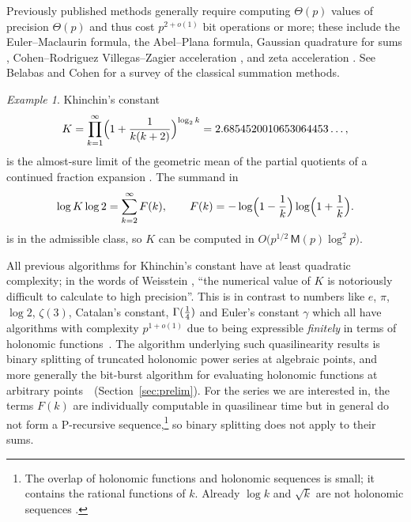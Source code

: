 \documentclass[11pt,reqno]{amsart}
\theoremstyle{definition}
\theoremstyle{remark}
\newtheorem{example}[theorem]{Example}
\newcommand{\Mul}{\mathsf{M}}
\begin{document}
Previously published methods
generally require computing $\Theta(p)$ values of precision $\Theta(p)$
and thus cost $p^{2+o(1)}$ bit operations or more;
these include the Euler--Maclaurin formula, the Abel--Plana formula, Gaussian quadrature
for sums \cite{Mon10,GM85},
Cohen--Rodriguez Villegas--Zagier acceleration \cite{CRVZ00},
and zeta acceleration \cite{SW59,BBC97,FV96}.
See Belabas and Cohen \cite{BC21} for a survey of the classical summation methods.


\begin{example}

Khinchin's constant
\[
  K = \prod_{k=1}^{\infty} \Bigl(1 + \frac{1}{k(k+2)}\Bigr)^{\log_2 k} = 2.6854520010653064453\ldots,
\]
is the almost-sure limit of the geometric mean of the partial quotients of a continued fraction
expansion \cite{Khi35}. The summand in
\begin{equation}\label{eq:logK}
  \log K \log 2 = \sum_{k=2}^{\infty} F(k), \qquad F(k) = -\log\Bigl(1-\frac1k\Bigr)\log\Bigl(1+\frac1k\Bigr).
\end{equation}
is in the admissible class, so $K$ can be computed in $O\bigl(p^{1/2}\, \Mul(p) \log^2 p\bigr)$.
\end{example}

All previous algorithms for Khinchin's constant
have at least quadratic complexity;
in the words of Weisstein \cite{MWKdigits}, ``the numerical value of $K$ is
notoriously difficult to calculate to high precision''.
This is in contrast to numbers like
$e$, $\pi$, $\log 2$, $\zeta(3)$, Catalan's constant, $\smash \Gamma(\frac14)$ and
Euler's constant $\gamma$ which
all have algorithms with complexity $p^{1+o(1)}$
due to being expressible \emph{finitely} in terms of
holonomic functions~\cite{BB87,HP98,BM80,BZ10}.
The algorithm underlying such quasilinearity results is binary splitting
of truncated holonomic power series at algebraic points,
and more generally the bit-burst algorithm for evaluating
holonomic functions at arbitrary points~\cite{CC90,vdH99}~(Section~\ref{sec:prelim}).
For the series we are interested in, the terms $F(k)$ are
individually computable in quasilinear time but in general do
not form a P-recursive sequence,\footnote{The overlap of holonomic functions
and holonomic sequences is small; it contains the rational functions of $k$. Already $\log k$ and $\sqrt k$ are not holonomic sequences \cite{FGS05}.}
so binary splitting does not apply to their sums.
\end{document}
